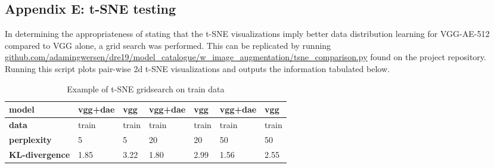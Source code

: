 \subsection*{Appendix E: t-SNE testing} \label{appendix: E}

In determining the appropriateness of stating that the t-SNE visualizations imply better data distribution learning for VGG-AE-512 compared to VGG alone, a grid search was performed.
This can be replicated by running \url{github.com/adamingwersen/dre19/model_catalogue/w_image_augmentation/tsne_comparison.py} found on the project repository.
Running this script plots pair-wise 2d t-SNE visualizations and outputs the information tabulated below.

\begin{table}[H]
    \begin{tabular}{@{}lllllll@{}}
    \toprule
    \textbf{model}         & vgg+dae & vgg   & vgg+dae & vgg   & vgg+dae & vgg   \\ \midrule
    \textbf{data}          & train   & train & train   & train & train   & train \\
    \textbf{perplexity}    & 5       & 5     & 20      & 20    & 50      & 50    \\
    \textbf{KL-divergence} & 1.85    & 3.22  & 1.80    & 2.99  & 1.56    & 2.55  \\ \bottomrule
    \end{tabular}
    \caption{Example of t-SNE gridsearch on train data}
    \label{tab:tsnecomp}
\end{table}